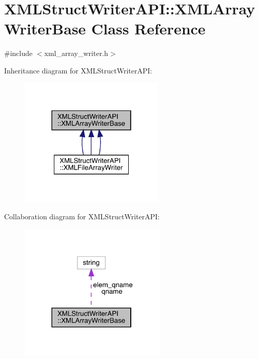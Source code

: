 \hypertarget{classXMLStructWriterAPI_1_1XMLArrayWriterBase}{}\section{X\+M\+L\+Struct\+Writer\+A\+PI\+:\+:X\+M\+L\+Array\+Writer\+Base Class Reference}
\label{classXMLStructWriterAPI_1_1XMLArrayWriterBase}


{\ttfamily \#include $<$xml\+\_\+array\+\_\+writer.\+h$>$}



Inheritance diagram for X\+M\+L\+Struct\+Writer\+A\+PI\+:
\nopagebreak
\begin{figure}[H]
\begin{center}
\leavevmode
\includegraphics[width=195pt]{df/d38/classXMLStructWriterAPI_1_1XMLArrayWriterBase__inherit__graph}
\end{center}
\end{figure}


Collaboration diagram for X\+M\+L\+Struct\+Writer\+A\+PI\+:\nopagebreak
\begin{figure}[H]
\begin{center}
\leavevmode
\includegraphics[width=198pt]{d0/dd8/classXMLStructWriterAPI_1_1XMLArrayWriterBase__coll__graph}
\end{center}
\end{figure}
